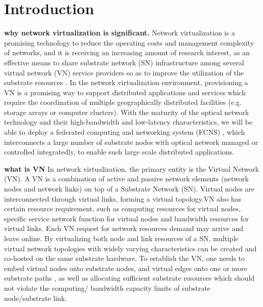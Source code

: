 
\section{Introduction}
\label{sec:Introduction}
\textbf{why network virtualization is significant.} Network virtualization is a promising technology to reduce the operating costs and management complexity of networks, and it is receiving an increasing amount of research interest\cite{chowdhury2009network}, as an effective means to share substrate network (SN) infrastructure among several virtual network (VN) service providers so as to improve the utilization of the substrate resources \cite{armbrust2009above,yu2008rethinking}. In the network virtualization environment, provisioning a VN is a promising way to support distributed applications and services which require the coordination of multiple geographically distributed facilities (e.g. storage arrays or computer clusters). With the maturity of the optical network technology and their high-bandwidth and low-latency characteristics, we will be able to deploy a federated computing and networking system (FCNS) \cite{zhang2013effective,papagianni2013optimal}, which interconnects a large number of substrate nodes with optical network managed or controlled integratedly, to enable such large scale distributed applications.

\textbf{what is VN }In network virtualization, the primary entity is the Virtual Network (VN). A VN is a combination of active and passive network elements (network nodes and network links) on top of a Substrate Network (SN). Virtual nodes are interconnected through virtual links, forming a virtual topology.VN also has certain resource requirement, such as computing resources for virtual nodes, specific service network function for virtual nodes and bandwidth resources for virtual links. Each VN request for network resources demand may arrive and leave online. By virtualizing both node and link resources of a SN, multiple virtual network topologies with widely varying characteristics can be created and co-hosted on the same substrate hardware.
 To establish the VN, one needs to embed virtual nodes onto substrate nodes, and virtual edges onto one or more substrate paths\cite{yu2008rethinking} , as well as allocating sufficient substrate resources which should not violate the computing/ bandwidth capacity limits of substrate node/substrate link.



